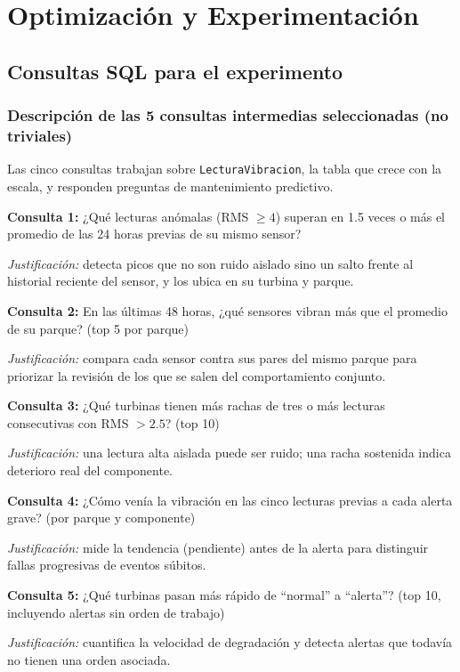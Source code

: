 
\section{Optimización y Experimentación}

\subsection{Consultas SQL para el experimento}

\subsubsection{Descripción de las 5 consultas intermedias seleccionadas (no triviales)}

Las cinco consultas trabajan sobre \texttt{LecturaVibracion}, la tabla que crece
con la escala, y responden preguntas de mantenimiento predictivo.

\textbf{Consulta 1:} ¿Qué lecturas anómalas (RMS $\ge 4$) superan en 1.5 veces o
más el promedio de las 24 horas previas de su mismo sensor?

\textit{Justificación:} detecta picos que no son ruido aislado sino un salto
frente al historial reciente del sensor, y los ubica en su turbina y parque.

\textbf{Consulta 2:} En las últimas 48 horas, ¿qué sensores vibran más que el
promedio de su parque? (top 5 por parque)

\textit{Justificación:} compara cada sensor contra sus pares del mismo parque
para priorizar la revisión de los que se salen del comportamiento conjunto.

\textbf{Consulta 3:} ¿Qué turbinas tienen más rachas de tres o más lecturas
consecutivas con RMS $> 2.5$? (top 10)

\textit{Justificación:} una lectura alta aislada puede ser ruido; una racha
sostenida indica deterioro real del componente.

\textbf{Consulta 4:} ¿Cómo venía la vibración en las cinco lecturas previas a
cada alerta grave? (por parque y componente)

\textit{Justificación:} mide la tendencia (pendiente) antes de la alerta para
distinguir fallas progresivas de eventos súbitos.

\textbf{Consulta 5:} ¿Qué turbinas pasan más rápido de ``normal'' a ``alerta''?
(top 10, incluyendo alertas sin orden de trabajo)

\textit{Justificación:} cuantifica la velocidad de degradación y detecta
alertas que todavía no tienen una orden asociada.

